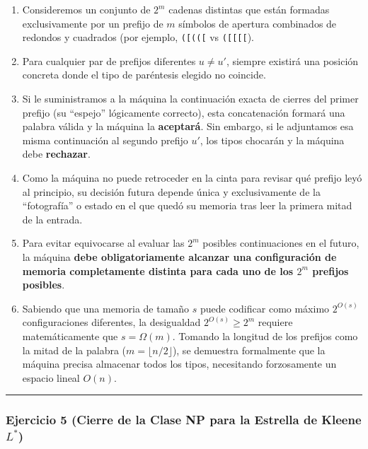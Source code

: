 \documentclass[12pt]{book} %
\providecommand{\tightlist}{%
  \setlength{\itemsep}{0pt}\setlength{\parskip}{0pt}}
\begin{document}
\begin{enumerate}
\def\labelenumi{\arabic{enumi}.}
\tightlist
\item
  Consideremos un conjunto de \(2^m\) cadenas distintas que están
  formadas exclusivamente por un prefijo de \(m\) símbolos de apertura
  combinados de redondos y cuadrados (por ejemplo, \texttt{({[}(({[}} vs
  \texttt{({[}{[}{[}{[}}).
\item
  Para cualquier par de prefijos diferentes \(u \neq u'\), siempre
  existirá una posición concreta donde el tipo de paréntesis elegido no
  coincide.
\item
  Si le suministramos a la máquina la continuación exacta de cierres del
  primer prefijo (su ``espejo'' lógicamente correcto), esta
  concatenación formará una palabra válida y la máquina la
  \textbf{aceptará}. Sin embargo, si le adjuntamos esa misma
  continuación al segundo prefijo \(u'\), los tipos chocarán y la
  máquina debe \textbf{rechazar}.
\item
  Como la máquina no puede retroceder en la cinta para revisar qué
  prefijo leyó al principio, su decisión futura depende única y
  exclusivamente de la ``fotografía'' o estado en el que quedó su
  memoria tras leer la primera mitad de la entrada.
\item
  Para evitar equivocarse al evaluar las \(2^m\) posibles continuaciones
  en el futuro, la máquina \textbf{debe obligatoriamente alcanzar una
  configuración de memoria completamente distinta para cada uno de los
  \(2^m\) prefijos posibles}.
\item
  Sabiendo que una memoria de tamaño \(s\) puede codificar como máximo
  \(2^{O(s)}\) configuraciones diferentes, la desigualdad
  \(2^{O(s)} \ge 2^m\) requiere matemáticamente que
  \textbf{\(s = \Omega(m)\)}. Tomando la longitud de los prefijos como
  la mitad de la palabra (\(m = \lfloor n/2 \rfloor\)), se demuestra
  formalmente que la máquina precisa almacenar todos los tipos,
  necesitando forzosamente un espacio lineal \textbf{\(O(n)\)}.
\end{enumerate}

\begin{center}\rule{0.5\linewidth}{0.5pt}\end{center}

\hypertarget{ejercicio-5-cierre-de-la-clase-np-para-la-estrella-de-kleene-l}{%
\subsubsection{\texorpdfstring{Ejercicio 5 (Cierre de la Clase NP para
la Estrella de Kleene
\(L^*\))}{Ejercicio 5 (Cierre de la Clase NP para la Estrella de Kleene L\^{}*)}}\label{ejercicio-5-cierre-de-la-clase-np-para-la-estrella-de-kleene-l}}
\end{document}
